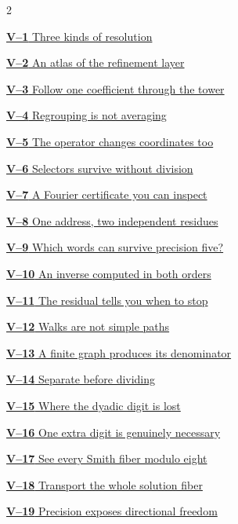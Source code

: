 \documentclass[11pt,a4paper]{article}
\begin{document}
\begin{multicols}{2}
{\small\noindent\hyperlink{vpage1}{\textbf{V--1} Three kinds of resolution}\par\smallskip}
{\small\noindent\hyperlink{vpage2}{\textbf{V--2} An atlas of the refinement layer}\par\smallskip}
{\small\noindent\hyperlink{vpage3}{\textbf{V--3} Follow one coefficient through the tower}\par\smallskip}
{\small\noindent\hyperlink{vpage4}{\textbf{V--4} Regrouping is not averaging}\par\smallskip}
{\small\noindent\hyperlink{vpage5}{\textbf{V--5} The operator changes coordinates too}\par\smallskip}
{\small\noindent\hyperlink{vpage6}{\textbf{V--6} Selectors survive without division}\par\smallskip}
{\small\noindent\hyperlink{vpage7}{\textbf{V--7} A Fourier certificate you can inspect}\par\smallskip}
{\small\noindent\hyperlink{vpage8}{\textbf{V--8} One address, two independent residues}\par\smallskip}
{\small\noindent\hyperlink{vpage9}{\textbf{V--9} Which words can survive precision five?}\par\smallskip}
{\small\noindent\hyperlink{vpage10}{\textbf{V--10} An inverse computed in both orders}\par\smallskip}
{\small\noindent\hyperlink{vpage11}{\textbf{V--11} The residual tells you when to stop}\par\smallskip}
{\small\noindent\hyperlink{vpage12}{\textbf{V--12} Walks are not simple paths}\par\smallskip}
{\small\noindent\hyperlink{vpage13}{\textbf{V--13} A finite graph produces its denominator}\par\smallskip}
{\small\noindent\hyperlink{vpage14}{\textbf{V--14} Separate before dividing}\par\smallskip}
{\small\noindent\hyperlink{vpage15}{\textbf{V--15} Where the dyadic digit is lost}\par\smallskip}
{\small\noindent\hyperlink{vpage16}{\textbf{V--16} One extra digit is genuinely necessary}\par\smallskip}
{\small\noindent\hyperlink{vpage17}{\textbf{V--17} See every Smith fiber modulo eight}\par\smallskip}
{\small\noindent\hyperlink{vpage18}{\textbf{V--18} Transport the whole solution fiber}\par\smallskip}
{\small\noindent\hyperlink{vpage19}{\textbf{V--19} Precision exposes directional freedom}\par\smallskip}

\end{multicols}
\end{document}
